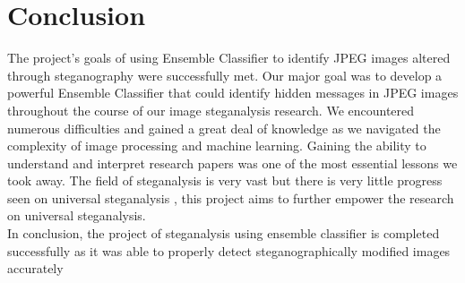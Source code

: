 \chapter{Conclusion}
The project's goals of using Ensemble Classifier to identify JPEG images altered through steganography were successfully met. Our major goal was to develop a powerful Ensemble Classifier that could identify hidden messages in JPEG images throughout the course of our image steganalysis research. We encountered numerous difficulties and gained a great deal of knowledge as we navigated the complexity of image processing and machine learning. Gaining the ability to understand and interpret research papers was one of the most essential lessons we took away. The field of steganalysis is very vast but there is very little progress seen on universal steganalysis , this project aims to further empower the research on universal steganalysis.\\
In conclusion, the project of steganalysis using ensemble classifier is completed successfully as it was able to properly detect steganographically modified images accurately

\clearpage


